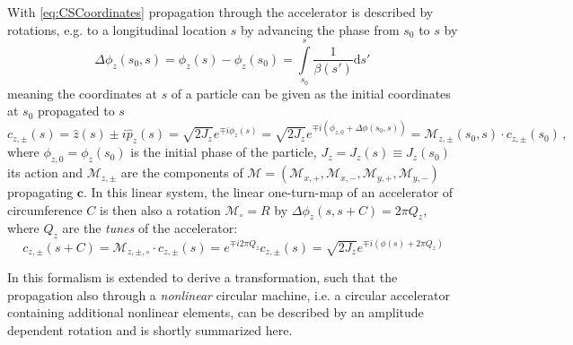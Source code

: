 With \cref{eq:CSCoordinates} propagation through the accelerator is described by rotations, 
e.g. to a longitudinal location $s$ by advancing the phase from $s_0$ to $s$ by 
%
\begin{equation}
    \label{eq:PhaseAdvance}
    \Delta\phi_z(s_0, s) = \phi_z(s) - \phi_z(s_0) = \int\limits_{s_0}^s \frac{1}{\beta(s')} \mathrm{d}s' \, 
\end{equation}
%
meaning the coordinates at $s$ of a particle can be given as the initial coordinates at $s_0$ propagated to $s$
%
\begin{equation}
    \label{eq:CSCoordinatesAtLocation}
    c_{z,\pm}(s) = \hat{z}(s) \pm i\hat{p}_z(s) = \sqrt{2J_z}e^{\mp i \phi_z(s) } = \sqrt{2J_z}e^{\mp i \left(\phi_{z,0} + \Delta\phi(s_0, s)  \right)}  = \mathcal{M}_{z,\pm}(s_0, s) \cdot c_{z,\pm}(s_0)\, ,
\end{equation}
where $\phi_{z,0} = \phi_z(s_0)$ is the initial phase of the particle, $J_z = J_z(s) \equiv J_z(s_0)$ its action
and $\mathcal{M}_{z,\pm}$ are the components of $\mathcal{M} = (\mathcal{M}_{x,+}, \mathcal{M}_{x,-},\mathcal{M}_{y,+},\mathcal{M}_{y,-})$ propagating $\bm{c}$.
%
In this linear system, the linear one-turn-map of an accelerator of circumference $C$ is then also a rotation $\mathcal{M}_\circ = R$
by $\Delta\phi_z(s, s+C) = 2\pi Q_z$, where $Q_z$ are the \textit{tunes} of the accelerator:
\begin{equation}
    \label{eq:PropagationOfC}
    c_{z,\pm}(s + C) = \mathcal{M}_{z,\pm,\circ} \cdot c_{z,\pm}(s) = e^{\mp i2\pi Q_z} c_{z,\pm}(s)  = \sqrt{2J_z}e^{\mp i \left(\phi(s) + 2\pi Q_z\right) }
\end{equation}

In \cite{BengtssonAnalyticalCalculationsSmear1990,ForestHamiltonianFreeDescription1990,TomasDirectMeasurementResonance2003,FranchiStudiesMeasurementsLinear2006,CarlierNonlinearFutureMeasurements2020}
this formalism is extended to derive a transformation, such that the propagation also through a \textit{nonlinear} circular machine, 
i.e. a circular accelerator containing additional nonlinear elements, 
can be described by an amplitude dependent rotation and is shortly summarized here.


